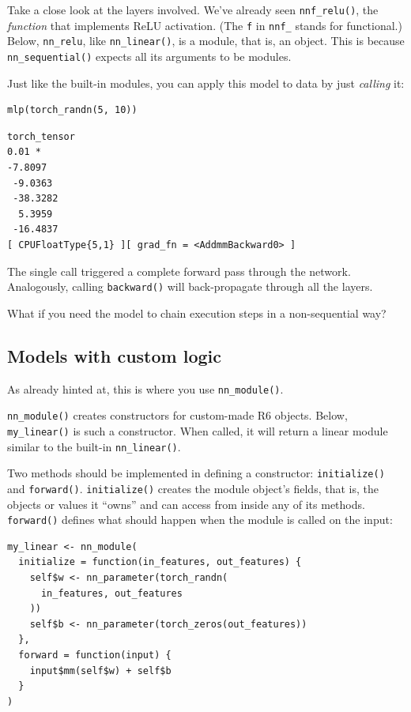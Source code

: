 \documentclass[
  letterpaper,
]{krantz}
\begin{document}
Take a close look at the layers involved. We've already seen
\texttt{nnf\_relu()}, the \emph{function} that implements ReLU
activation. (The \texttt{f} in \texttt{nnf\_} stands for functional.)
Below, \texttt{nn\_relu}, like \texttt{nn\_linear()}, is a module, that
is, an object. This is because \texttt{nn\_sequential()} expects all its
arguments to be modules.

Just like the built-in modules, you can apply this model to data by just
\emph{calling} it:

\begin{verbatim}
mlp(torch_randn(5, 10))
\end{verbatim}

\begin{verbatim}
torch_tensor
0.01 *
-7.8097
 -9.0363
 -38.3282
  5.3959
 -16.4837
[ CPUFloatType{5,1} ][ grad_fn = <AddmmBackward0> ]
\end{verbatim}

The single call triggered a complete forward pass through the network.
Analogously, calling \texttt{backward()} will
back-propagate through all the layers.

What if you need the model to chain execution steps in a non-sequential
way?

\hypertarget{models-with-custom-logic}{%
\subsection{Models with custom logic}\label{models-with-custom-logic}}

As already hinted at, this is where you use \texttt{nn\_module()}.

\texttt{nn\_module()} creates constructors for custom-made R6 objects.
Below, \texttt{my\_linear()} is such a constructor. When called, it will
return a linear module similar to the built-in \texttt{nn\_linear()}.

Two methods should be implemented in defining a constructor:
\texttt{initialize()} and \texttt{forward()}. \texttt{initialize()}
creates the module object's fields, that is, the objects or values it
``owns'' and can access from inside any of its methods.
\texttt{forward()} defines what should happen when the module is called
on the input:

\begin{verbatim}
my_linear <- nn_module(
  initialize = function(in_features, out_features) {
    self$w <- nn_parameter(torch_randn(
      in_features, out_features
    ))
    self$b <- nn_parameter(torch_zeros(out_features))
  },
  forward = function(input) {
    input$mm(self$w) + self$b
  }
)
\end{verbatim}
\end{document}

